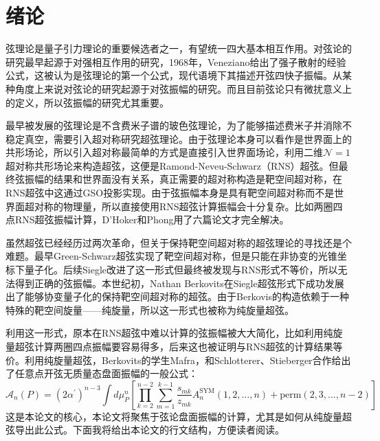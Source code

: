 \chapter{绪论}
弦理论是量子引力理论的重要候选者之一，有望统一四大基本相互作用。对弦论的研究最早起源于对强相互作用的研究，1968年，Veneziano给出了强子散射的经验公式，这被认为是弦理论的第一个公式，现代语境下其描述开弦四快子振幅。从某种角度上来说对弦论的研究起源于对弦振幅的研究。而且目前弦论只有微扰意义上的定义，所以弦振幅的研究尤其重要\cite{berkovits2022snowmasswhitepaperstring}。

最早被发展的弦理论是不含费米子谱的玻色弦理论，为了能够描述费米子并消除不稳定真空，需要引入超对称研究超弦理论。由于弦理论本身可以看作是世界面上的共形场论，所以引入超对称最简单的方式是直接引入世界面场论，利用二维$\mathcal{N}=1$ 超对称共形场论来构造超弦，这便是Ramond-Neveu-Schwarz（RNS）超弦。但最终弦振幅的结果和世界面没有关系，真正需要的超对称构造是靶空间超对称，在RNS超弦中这通过GSO投影实现。由于弦振幅本身是具有靶空间超对称而不是世界面超对称的物理量，所以直接使用RNS超弦计算振幅会十分复杂。比如两圈四点RNS超弦振幅计算，D'Hoker和Phong用了六篇论文才完全解决\cite{DHoker:2001kkt,DHoker:2001qqx,DHoker:2001foj,DHoker:2001jaf,DHoker:2005dys,DHoker:2005vch,DHoker:2002hof}。

虽然超弦已经经历过两次革命，但关于保持靶空间超对称的超弦理论的寻找还是个难题。最早Green-Schwarz超弦\cite{Green:1983wt,Green:1983sg}实现了靶空间超对称，但是只能在非协变的光锥坐标下量子化。后续Siegle改进了这一形式\cite{Siegel:1985xj}但最终被发现与RNS形式不等价，所以无法得到正确的弦振幅。本世纪初，Nathan Berkovits在Siegle超弦形式下成功发展出了能够协变量子化的保持靶空间超对称的超弦\cite{Berkovits:2000fe}。由于Berkovis的构造依赖于一种特殊的靶空间旋量——纯旋量，所以这一形式也被称为纯旋量超弦。

利用这一形式，原本在RNS超弦中难以计算的弦振幅被大大简化，比如利用纯旋量超弦计算两圈四点振幅要容易得多\cite{Berkovits:2005df}，后来这也被证明与RNS超弦的计算结果等价\cite{Berkovits:2005ng}。利用纯旋量超弦，Berkovits的学生Mafra，和Schlotterer、Stieberger合作给出了任意点开弦无质量态盘面振幅的一般公式\cite{Mafra:2011nv,Mafra:2011nw}：
\begin{equation}
	\mathcal{A}_{n}(P)=(2\alpha^{\prime})^{n-3}\int d\mu_{P}^{n}\left[\prod_{k=2}^{n-2}\sum_{m=1}^{k-1}\frac{s_{mk}}{z_{mk}}A^{\text{SYM}}_{n}(1,2,\ldots,n)+\mathrm{perm}(2,3,\ldots,n-2)\right]
\end{equation}
这是本论文的核心，本论文将聚焦于弦论盘面振幅的计算，尤其是如何从纯旋量超弦导出此公式。下面我将给出本论文的行文结构，方便读者阅读。

